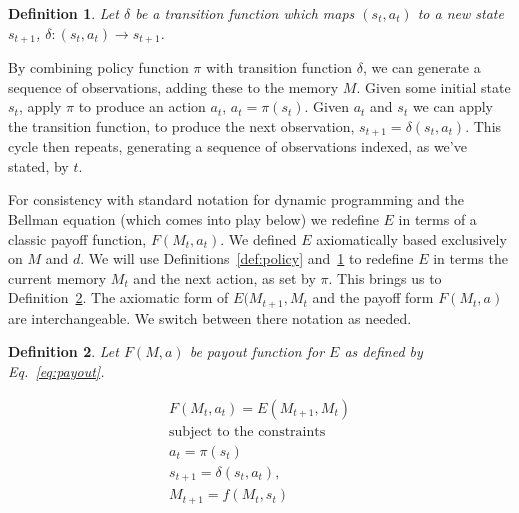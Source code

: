 \documentclass[9pt,twocolumn,twoside]{pnas-new}
\newtheorem{definition}{Definition}
\begin{document}
\begin{definition}
    \label{def:transition}
    Let $\delta$ be a transition function which maps $(s_{t},a_t)$ to a new state $s_{t+1}$, $\delta : (s_{t}, a_t) \rightarrow s_{t+1}$.     
\end{definition}

By combining policy function $\pi$ with transition function $\delta$, we can generate a sequence of observations, adding these to the memory $M$. Given some initial state $s_{t}$, apply $\pi$ to produce an action $a_t$, $a_t = \pi(s_{t})$. Given $a_t$ and $s_{t}$ we can apply the transition function, to produce the next observation, $s_{t+1} = \delta (s_{t},a_t)$. This cycle then repeats, generating a sequence of observations indexed, as we've stated, by $t$.



For consistency with standard notation for dynamic programming and the Bellman equation (which comes into play below) we redefine $E$ in terms of a classic payoff function, $F(M_{t}, a_t)$. We defined $E$ axiomatically based exclusively on $M$ and $d$. We will use Definitions~\ref{def:policy} and~\ref{def:transition} to redefine $E$ in terms the current memory $M_{t}$ and the next action, as set by $\pi$. This brings us to Definition~\ref{def:payoff}. The axiomatic form of $E(M_{t+1},M_{t}$ and the payoff form $F(M_t, a)$ are interchangeable. We switch between there notation as needed.

\begin{definition}
    \label{def:payoff}
    Let $F(M, a)$ be payout function for $E$ as defined by Eq.~\ref{eq:payout}.
\end{definition}

\begin{equation}
    \begin{split} \label{eq:payout}
    F(M_{t}, a_t) = E(M_{t+1}, M_{t})\\
    \text{subject to the constraints} \\
    a_{t} = \pi(s_t) \\
    s_{t+1} = \delta(s_{t}, a_t),\\ 
    M_{t+1} = f(M_{t}, s_{t})
    \end{split} 
\end{equation}
\end{document}
